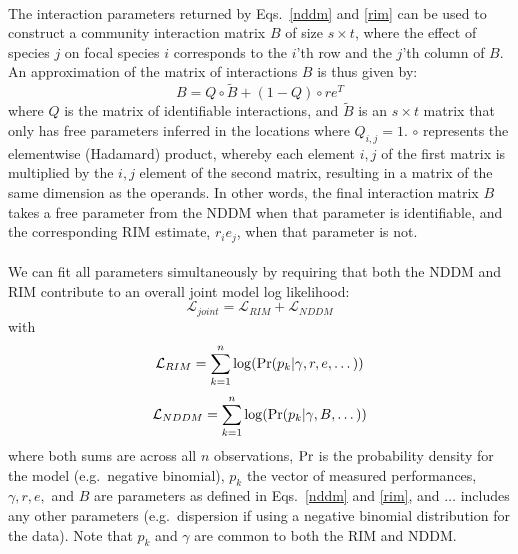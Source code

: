 \documentclass[a4,12pt]{article}
\begin{document}
\begin{refsection}
    \paragraph{}
    The interaction parameters returned by Eqs.~\ref{nddm} and \ref{rim} can be used to construct a community interaction matrix $B$ of size $s \times t$, where the effect of species $j$ on focal species $i$ corresponds to the $i$'th row and the $j$'th column of $B$. An approximation of the matrix of interactions $B$ is thus given by:
        \begin{equation}
        B = Q \circ \tilde B + (1 - Q) \circ r e^T
        \label{matB}
        \end{equation}
    where $Q$ is the matrix of identifiable interactions, and $\tilde B$ is an $s \times t$ matrix that only has free parameters inferred in the locations where $Q_{i, j} =1$. $\circ$ represents the elementwise (Hadamard) product, whereby each element $i, j$ of the first matrix is multiplied by the $i, j$ element of the second matrix, resulting in a matrix of the same dimension as the operands. In other words, the final interaction matrix $B$ takes a free parameter from the NDDM when that parameter is identifiable, and the corresponding RIM estimate, $r_i e_j$, when that parameter is not.

    \paragraph{}
    We can fit all parameters simultaneously by requiring that both the NDDM and RIM contribute to an overall joint model log likelihood:
         \begin{equation}
        \mathcal{L}_{joint} = \mathcal{L}_{RIM} + \mathcal{L}_{NDDM}
        \label{loglikjoint}
        \end{equation}
    with
        \begin{equation}
        \mathcal{L}_{RIM} = \sum_{k=1}^{n} \log ({\rm Pr} (p_k | \gamma, r, e, \dots))
        \label{logrim}
        \end{equation}
        \begin{equation}
        \mathcal{L}_{NDDM} = \sum_{k=1}^{n} \log ({\rm Pr} (p_k | \gamma, B, \dots))
        \label{lognddm}
        \end{equation}
    where both sums are across all $n$ observations, ${\rm Pr}$ is the probability density for the model (e.g.\ negative binomial), $p_k$ the vector of measured performances, $\gamma, r, e,$ and $B$ are parameters as defined in Eqs.~\ref{nddm} and \ref{rim}, and $\dots$ includes any other parameters (e.g.\ dispersion if using a negative binomial distribution for the data). Note that $p_k$ and $\gamma$ are common to both the RIM and NDDM.


\end{refsection}
\end{document}
